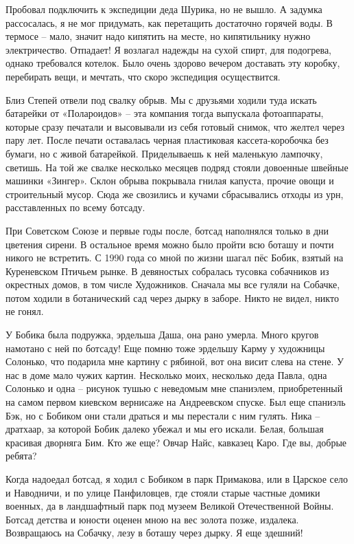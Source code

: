 Пробовал подключить к экспедиции деда Шурика, но не вышло. А задумка рассосалась, я не мог придумать, как перетащить достаточно горячей воды. В термосе – мало, значит надо кипятить на месте, но кипятильнику нужно электричество. Отпадает! Я возлагал надежды на сухой спирт, для подогрева, однако требовался котелок. Было очень здорово вечером доставать эту коробку, перебирать вещи, и мечтать, что скоро экспедиция осуществится.

Близ Степей отвели под свалку обрыв. Мы с друзьями ходили туда искать батарейки от «Полароидов» – эта компания тогда выпускала фотоаппараты, которые сразу печатали и высовывали из себя готовый снимок, что желтел через пару лет. После печати оставалась черная пластиковая кассета-коробочка без бумаги, но с живой батарейкой. Приделываешь к ней маленькую лампочку, светишь. На той же свалке несколько месяцев подряд стояли довоенные швейные машинки «Зингер». Склон обрыва покрывала гнилая капуста, прочие овощи и строительный мусор. Сюда же свозились и кучами сбрасывались отходы из урн, расставленных по всему ботсаду.

При Советском Союзе и первые годы после, ботсад наполнялся только в дни цветения сирени. В остальное время можно было пройти всю боташу и почти никого не встретить. С 1990 года со мной по жизни шагал пёс Бобик, взятый на Куреневском Птичьем рынке. В девяностых собралась тусовка собачников из окрестных домов, в том числе Художников. Сначала мы все гуляли на Собачке, потом ходили в ботанический сад через дырку в заборе. Никто не видел, никто не гонял. 

У Бобика была подружка, эрдельша Даша, она рано умерла. Много кругов намотано с ней по ботсаду! Еще помню тоже эрдельшу Карму у художницы Солонько, что подарила мне картину с рябиной, вот она висит слева на стене. У нас в доме мало чужих картин. Несколько моих, несколько деда Павла, одна Солонько и одна – рисунок тушью с неведомым мне спаниэлем, приобретенный на самом первом киевском вернисаже на Андреевском спуске. Был еще спаниэль Бэк, но с Бобиком они стали драться и мы перестали с ним гулять. Ника – дратхаар, за которой Бобик далеко убежал и мы его искали. Белая, большая красивая дворняга Бим. Кто же еще? Овчар Найс, кавказец Каро. Где вы, добрые ребята?

Когда надоедал ботсад, я ходил с Бобиком в парк Примакова, или в Царское село и Наводничи, и по улице Панфиловцев, где стояли старые частные домики военных, да в ландшафтный парк под музеем Великой Отечественной Войны. Ботсад детства и юности оценен мною на вес золота позже, издалека. Возвращаюсь на Собачку, лезу в боташу через дырку. Я еще здешний!


